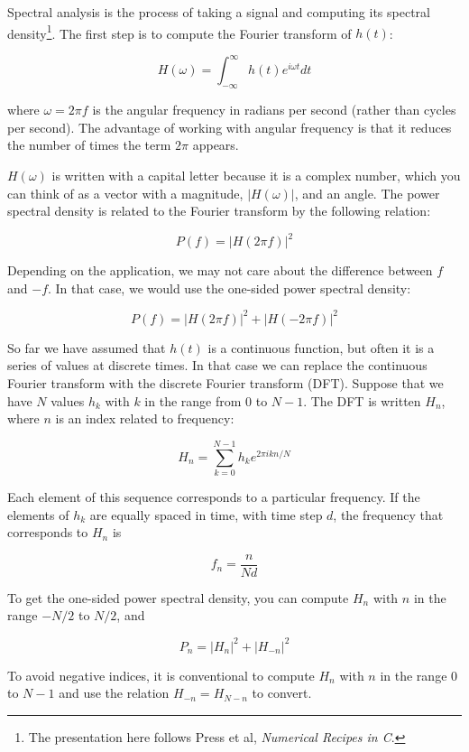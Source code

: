 \documentclass[10pt]{book}
\begin{document}
Spectral analysis is the process of taking a signal and computing its
spectral density\footnote{The presentation here follows Press et al,
  {\em Numerical Recipes in C}.}.  The first step is to compute the
  Fourier transform of $h(t)$:

\[ H(\omega) = \int_{-\infty}^{\infty} h(t) e^{i \omega t} dt \]

where $\omega = 2 \pi f$ is the angular frequency in
radians per second (rather than cycles per second).  The advantage
of working with angular frequency is that it reduces the number
of times the term $2 \pi$ appears.

$H(\omega)$ is written with a capital letter because it is a complex
number, which you can think of as a vector with a magnitude,
$|H(\omega)|$, and an angle.  The power spectral density is related to
the Fourier transform by the following relation:

\[ P(f) = |H(2 \pi f)|^2 \]

Depending on the application, we may not care about the difference
between $f$ and $-f$.  In that case, we would use the one-sided
power spectral density:

\[ P(f) = |H(2 \pi f)|^2 + |H(-2 \pi f)|^2 \]

So far we have assumed that $h(t)$ is a continuous function, but
often it is a series of values at discrete times.  In that
case we can replace the continuous Fourier transform with
the discrete Fourier transform (DFT).  Suppose that we have
$N$ values $h_k$ with $k$ in the range from 0 to $N-1$.  The
DFT is written $H_n$, where $n$ is an index related to frequency:

\begin{equation}
\label{dft}
H_n = \sum_{k=0}^{N-1} h_k e^{2 \pi i k n / N}
\end{equation}

Each element of this sequence corresponds to a particular frequency.
If the elements of $h_k$ are equally spaced in time, with time
step $d$, the frequency that corresponds to $H_n$ is

\[ f_n = \frac{n}{N d} \]

To get the one-sided power spectral density, you can compute $H_n$
with $n$ in the range $-N/2$ to $N/2$, and

\[ P_n = |H_n|^2 + |H_{-n}|^2 \]

To avoid negative indices, it is conventional to compute
$H_n$ with $n$ in the range $0$ to $N-1$ and use the relation
$H_{-n} = H_{N-n}$ to convert.
\end{document}
